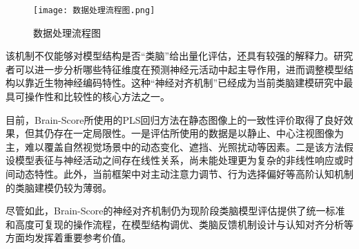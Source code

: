 \begin{figure}[hbt]
	\centering
	\texttt{[image: 数据处理流程图.png]}
	\caption{数据处理流程图}
	\label{f.sjcllct}
\end{figure}

该机制不仅能够对模型结构是否“类脑”给出量化评估，还具有较强的解释力。研究者可以进一步分析哪些特征维度在预测神经元活动中起主导作用，进而调整模型结构以靠近生物神经编码特性。这种“神经对齐机制”已经成为当前类脑建模研究中最具可操作性和比较性的核心方法之一。

目前，Brain-Score所使用的PLS回归方法在静态图像上的一致性评价取得了良好效果，但其仍存在一定局限性。一是评估所使用的数据是以静止、中心注视图像为主，难以覆盖自然视觉场景中的动态变化、遮挡、光照扰动等因素。二是该方法假设模型表征与神经活动之间存在线性关系，尚未能处理更为复杂的非线性响应或时间动态特性。此外，当前框架中对主动注意力调节、行为选择偏好等高阶认知机制的类脑建模仍较为薄弱。

尽管如此，Brain-Score的神经对齐机制仍为现阶段类脑模型评估提供了统一标准和高度可复现的操作流程，在模型结构调优、类脑反馈机制设计与认知对齐分析等方面均发挥着重要参考价值。

